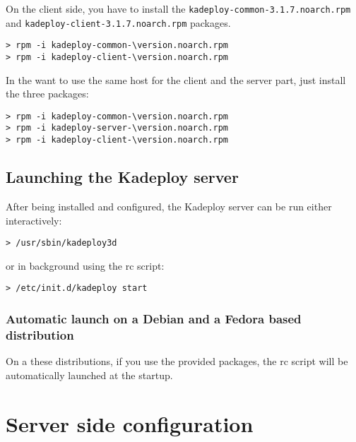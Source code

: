 \documentclass[a4wide,10pt,oneside]{book}
\newcommand{\version}{3.1.7}
\begin{document}
\noindent On the client side, you have to install the \texttt{kadeploy-common-\version.noarch.rpm} and \texttt{kadeploy-client-\version.noarch.rpm} packages.
\begin{small}
\begin{Verbatim}[commandchars=\\\{\}]
> rpm -i kadeploy-common-\version.noarch.rpm
> rpm -i kadeploy-client-\version.noarch.rpm
\end{Verbatim}
\end{small}

\noindent In the want to use the same host for the client and the server part, just install the three packages:
\begin{small}
\begin{Verbatim}[commandchars=\\\{\}]
> rpm -i kadeploy-common-\version.noarch.rpm
> rpm -i kadeploy-server-\version.noarch.rpm
> rpm -i kadeploy-client-\version.noarch.rpm
\end{Verbatim}
\end{small}


\section{Launching the Kadeploy server}
After being installed and configured, the Kadeploy server can be run either interactively:
\begin{small}
\begin{verbatim}
> /usr/sbin/kadeploy3d
\end{verbatim}
\end{small}
\noindent or in background using the rc script:
\begin{small}
\begin{verbatim}
> /etc/init.d/kadeploy start
\end{verbatim}
\end{small}

\subsection{Automatic launch on a Debian and a Fedora based distribution}
\noindent On a these distributions, if you use the provided packages, the rc script will be automatically launched at the startup.

\chapter{Server side configuration}\label{chap:Server_side_conf}
\end{document}
